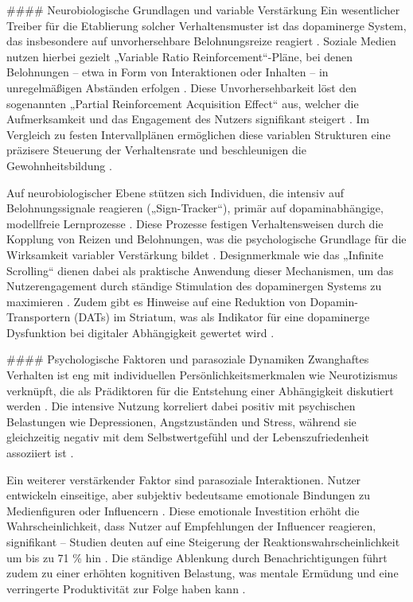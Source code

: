 \documentclass[11pt,a4paper]{article}
\begin{document}
\#\#\#\# Neurobiologische Grundlagen und variable Verstärkung Ein wesentlicher Treiber für die Etablierung solcher Verhaltensmuster ist das dopaminerge System, das insbesondere auf unvorhersehbare Belohnungsreize reagiert \autocite{crossref_10_51473_rcmos_v1i2_2025_1736}. Soziale Medien nutzen hierbei gezielt „Variable Ratio Reinforcement“-Pläne, bei denen Belohnungen – etwa in Form von Interaktionen oder Inhalten – in unregelmäßigen Abständen erfolgen \autocite{europepmc_42137086}. Diese Unvorhersehbarkeit löst den sogenannten „Partial Reinforcement Acquisition Effect“ aus, welcher die Aufmerksamkeit und das Engagement des Nutzers signifikant steigert \autocite{europepmc_42137086}. Im Vergleich zu festen Intervallplänen ermöglichen diese variablen Strukturen eine präzisere Steuerung der Verhaltensrate und beschleunigen die Gewohnheitsbildung \autocite{biorxiv_PPR584227,crossref_10_3758_bf03343141}.

Auf neurobiologischer Ebene stützen sich Individuen, die intensiv auf Belohnungssignale reagieren („Sign-Tracker“), primär auf dopaminabhängige, modellfreie Lernprozesse \autocite{europepmc_42137086,biorxiv_PPR584227}. Diese Prozesse festigen Verhaltensweisen durch die Kopplung von Reizen und Belohnungen, was die psychologische Grundlage für die Wirksamkeit variabler Verstärkung bildet \autocite{biorxiv_PPR584227,europepmc_42137086}. Designmerkmale wie das „Infinite Scrolling“ dienen dabei als praktische Anwendung dieser Mechanismen, um das Nutzerengagement durch ständige Stimulation des dopaminergen Systems zu maximieren \autocite{europepmc_42137086,biorxiv_PPR584227}. Zudem gibt es Hinweise auf eine Reduktion von Dopamin-Transportern (DATs) im Striatum, was als Indikator für eine dopaminerge Dysfunktion bei digitaler Abhängigkeit gewertet wird \autocite{crossref_10_51473_rcmos_v1i2_2025_1736}.

\#\#\#\# Psychologische Faktoren und parasoziale Dynamiken Zwanghaftes Verhalten ist eng mit individuellen Persönlichkeitsmerkmalen wie Neurotizismus verknüpft, die als Prädiktoren für die Entstehung einer Abhängigkeit diskutiert werden \autocite{doaj_10febcbb5e60420699a1d4570a075832}. Die intensive Nutzung korreliert dabei positiv mit psychischen Belastungen wie Depressionen, Angstzuständen und Stress, während sie gleichzeitig negativ mit dem Selbstwertgefühl und der Lebenszufriedenheit assoziiert ist \autocite{doaj_10febcbb5e60420699a1d4570a075832,openalex_W2924664363,grey_grey_3467cac0f11d4b1e86319128da218a3e}.

Ein weiterer verstärkender Faktor sind parasoziale Interaktionen. Nutzer entwickeln einseitige, aber subjektiv bedeutsame emotionale Bindungen zu Medienfiguren oder Influencern \autocite{europepmc_42073973,grey_grey_5d5c282590c448fc8776b04f78a08de5}. Diese emotionale Investition erhöht die Wahrscheinlichkeit, dass Nutzer auf Empfehlungen der Influencer reagieren, signifikant – Studien deuten auf eine Steigerung der Reaktionswahrscheinlichkeit um bis zu 71 \% hin \autocite{grey_grey_5d5c282590c448fc8776b04f78a08de5}. Die ständige Ablenkung durch Benachrichtigungen führt zudem zu einer erhöhten kognitiven Belastung, was mentale Ermüdung und eine verringerte Produktivität zur Folge haben kann \autocite{grey_grey_d4bc9c0d0e8441ba90398520e73af07d}.
\end{document}
